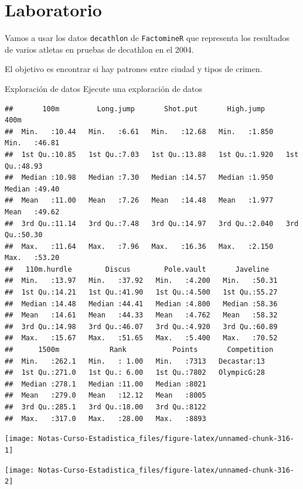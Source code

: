 \documentclass[
  12pt,
]{book}
\theoremstyle{definition}
\theoremstyle{definition}
\theoremstyle{definition}
\theoremstyle{remark}
\begin{document}
\hypertarget{laboratorio-7}{%
\section{Laboratorio}\label{laboratorio-7}}

Vamos a usar los datos \texttt{decathlon} de \texttt{FactomineR} que representa los resultados de varios atletas en pruebas de decathlon en el 2004.

El objetivo es encontrar si hay patrones entre ciudad y tipos de crimen.

Exploración de datos
Ejecute una exploración de datos

\begin{verbatim}
##       100m         Long.jump       Shot.put       High.jump          400m      
##  Min.   :10.44   Min.   :6.61   Min.   :12.68   Min.   :1.850   Min.   :46.81  
##  1st Qu.:10.85   1st Qu.:7.03   1st Qu.:13.88   1st Qu.:1.920   1st Qu.:48.93  
##  Median :10.98   Median :7.30   Median :14.57   Median :1.950   Median :49.40  
##  Mean   :11.00   Mean   :7.26   Mean   :14.48   Mean   :1.977   Mean   :49.62  
##  3rd Qu.:11.14   3rd Qu.:7.48   3rd Qu.:14.97   3rd Qu.:2.040   3rd Qu.:50.30  
##  Max.   :11.64   Max.   :7.96   Max.   :16.36   Max.   :2.150   Max.   :53.20  
##   110m.hurdle        Discus        Pole.vault       Javeline    
##  Min.   :13.97   Min.   :37.92   Min.   :4.200   Min.   :50.31  
##  1st Qu.:14.21   1st Qu.:41.90   1st Qu.:4.500   1st Qu.:55.27  
##  Median :14.48   Median :44.41   Median :4.800   Median :58.36  
##  Mean   :14.61   Mean   :44.33   Mean   :4.762   Mean   :58.32  
##  3rd Qu.:14.98   3rd Qu.:46.07   3rd Qu.:4.920   3rd Qu.:60.89  
##  Max.   :15.67   Max.   :51.65   Max.   :5.400   Max.   :70.52  
##      1500m            Rank           Points       Competition
##  Min.   :262.1   Min.   : 1.00   Min.   :7313   Decastar:13  
##  1st Qu.:271.0   1st Qu.: 6.00   1st Qu.:7802   OlympicG:28  
##  Median :278.1   Median :11.00   Median :8021                
##  Mean   :279.0   Mean   :12.12   Mean   :8005                
##  3rd Qu.:285.1   3rd Qu.:18.00   3rd Qu.:8122                
##  Max.   :317.0   Max.   :28.00   Max.   :8893
\end{verbatim}

\begin{center}\texttt{[image: Notas-Curso-Estadistica\_files/figure-latex/unnamed-chunk-316-1]} \end{center}

\begin{center}\texttt{[image: Notas-Curso-Estadistica\_files/figure-latex/unnamed-chunk-316-2]} \end{center}
\end{document}
